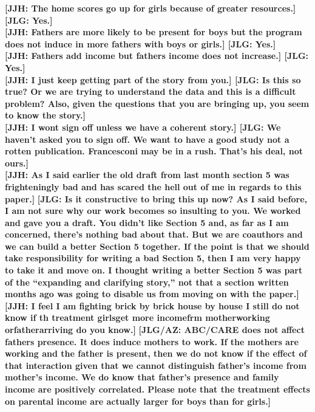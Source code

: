 \noindent \textbf{[JJH: The home scores go up for girls because of greater resources.] [JLG: Yes.]}\\

\noindent \textbf{[JJH: Fathers  are more likely to be present  for boys but the program does not induce in more fathers with boys or girls.] [JLG: Yes.]}\\

\noindent \textbf{[JJH: Fathers add income but fathers income does not increase.] [JLG: Yes.]}\\

\noindent \textbf{[JJH: I just keep getting part of the story from you.] [JLG: Is this so true? Or we are trying to understand the data and this is a difficult problem? Also, given the questions that you are bringing up, you seem to know the story.]}\\

\noindent \textbf{[JJH: I wont sign off unless we have a coherent story.] [JLG: We haven't asked you to sign off. We want to have a good study not a rotten publication. Francesconi may be in a rush. That's his deal, not ours.]}\\ 

\noindent \textbf{[JJH: As I said earlier the old draft from last month section 5 was frighteningly bad and has scared the hell out of me in regards to this paper.]} \textbf{[JLG: Is it constructive to bring this up now? As I said before, I am not sure why our work becomes so insulting to you. We worked and gave you a draft. You didn't like Section 5 and, as far as I am concerned, there's nothing bad about that. But we are coauthors and we can build a better Section 5 together. If the point is that we should take responsibility for writing a bad Section 5, then I am very happy to take it and move on. I thought writing a better Section 5 was part of the ``expanding and clarifying story,'' not that a section written months ago was going to disable us from moving on with the paper.]}\\

\noindent \textbf{[JJH: I feel I am fighting brick by brick house by house I still do not know if th treatment girlsget more incomefrm motherworking orfatherarriving do you know.]} \textbf{[JLG/AZ: ABC/CARE does not affect fathers presence. It does induce mothers to work. If the mothers are working and the father is present, then we do not know if the effect of that interaction given that we cannot distinguish father's income from mother's income. We do know that father's presence and family income are positively correlated. Please note that the treatment effects on parental income are actually larger for boys than for girls.]}\\


